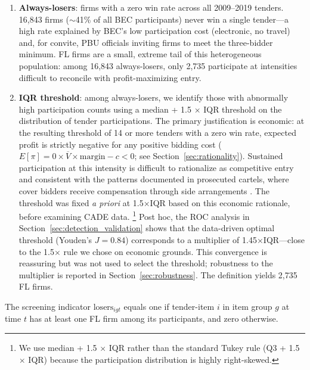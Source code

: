 \begin{enumerate}
  \item \textbf{Always-losers}: firms with a zero win rate across all
    2009--2019 tenders. 16,843 firms ($\sim$41\% of all
    BEC participants) never win a single tender---a high rate
    explained by BEC's low participation cost (electronic, no travel)
    and, for convite, PBU officials inviting firms to meet the
    three-bidder minimum. FL firms are a small, extreme tail of this
    heterogeneous population: among 16,843 always-losers, only 2,735
    participate at intensities difficult to reconcile with
    profit-maximizing entry.
  \item \textbf{IQR threshold}: among always-losers, we identify those
    with abnormally high participation counts using a median + 1.5
    $\times$ IQR threshold on the distribution of tender
    participations. The primary justification is economic: at the
    resulting threshold of 14 or more tenders with a zero win rate,
    expected profit is strictly negative for any positive bidding cost
    ($E[\pi] = 0 \times \overline{V} \times \text{margin} - c < 0$;
    see Section~\ref{sec:rationality}). Sustained participation at this
    intensity is difficult to rationalize as competitive entry and
    consistent with the patterns documented in prosecuted cartels,
    where cover bidders receive compensation through side arrangements
    \citep{asker2010leniency, marshall2012economics}. The
    threshold was fixed \emph{a priori} at 1.5$\times$IQR based on
    this economic rationale, before examining CADE data.%
    \footnote{We use median + 1.5 $\times$ IQR rather than the standard
    Tukey rule (Q3 + 1.5 $\times$ IQR) because the participation
    distribution is highly right-skewed.}
    Post hoc, the ROC analysis in
    Section~\ref{sec:detection_validation} shows that the
    data-driven optimal threshold (Youden's $J = 0.84$) corresponds
    to a multiplier of 1.45$\times$IQR---close to the 1.5$\times$
    rule we chose on economic grounds. This convergence is reassuring
    but was not used to select the threshold; robustness to the
    multiplier is reported in Section~\ref{sec:robustness}.
    The definition yields 2,735 FL firms.
\end{enumerate}

The screening indicator $\text{losers}_{igt}$ equals one if tender-item
$i$ in item group $g$ at time $t$ has at least one FL firm among its
participants, and zero otherwise.

